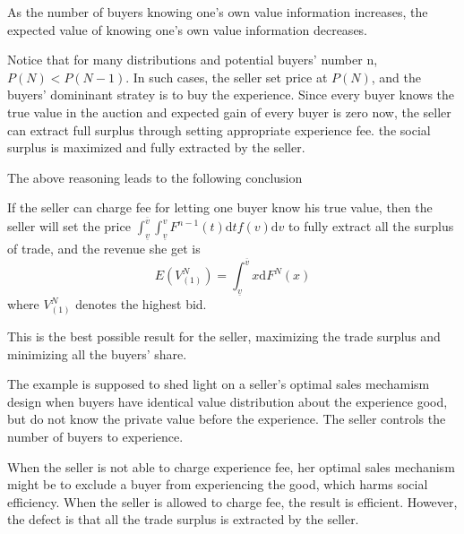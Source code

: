 \begin{lemma}
As the number of buyers knowing one's own value information increases, the expected value of knowing one's own value information decreases. 
\end{lemma}
Notice that for many distributions and potential buyers' number n, $P(N) < P(N-1)$. In such cases, the seller set price at $P(N)$, and 
the buyers' domininant stratey is to buy the experience. 
Since every buyer knows the true value in the auction and expected gain of every buyer is zero now, the seller can extract full surplus through setting appropriate experience fee. the 
social surplus is maximized and fully extracted by the seller. 



The above reasoning leads to the following conclusion

\begin{thm}

 If the seller can charge fee for letting one buyer know his true value, then the seller will set the price
 $ \int_{\underline{v}}^{\overline{v}}\int_{\underline{v}}^v F^{n-1}(t)\mathrm{d}tf(v)\mathrm{d}v$ to fully extract all the surplus of trade, and the revenue she get is 
 \begin{equation}
 E(V_{(1)}^N)=\int_{\underline{v}}^{\overline{v}} x\mathrm{d}F^N(x) 
 \end{equation}
where $V_{(1)}^N$ denotes the highest bid. 
\end{thm}
 This is the best possible result for the seller, maximizing the trade surplus and minimizing all the buyers' share. 


The example is supposed to shed light on a seller's optimal
sales mechamism design when buyers have identical value distribution about the
experience good, but do not know the private value before the experience. The seller controls the number of buyers to experience. 

When the seller is not able to charge experience fee, her optimal sales mechanism might be to exclude a buyer from experiencing the good, which harms social
 efficiency. When the seller is allowed to charge fee, the result is efficient. However, the defect is that
 all the trade surplus is extracted by the seller. 